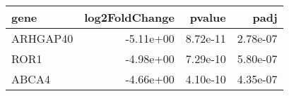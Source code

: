 \begin{tabular}{lrrr}
\toprule
    gene &  log2FoldChange &   pvalue &     padj \\
\midrule
ARHGAP40 &       -5.11e+00 & 8.72e-11 & 2.78e-07 \\
    ROR1 &       -4.98e+00 & 7.29e-10 & 5.80e-07 \\
   ABCA4 &       -4.66e+00 & 4.10e-10 & 4.35e-07 \\
\bottomrule
\end{tabular}
